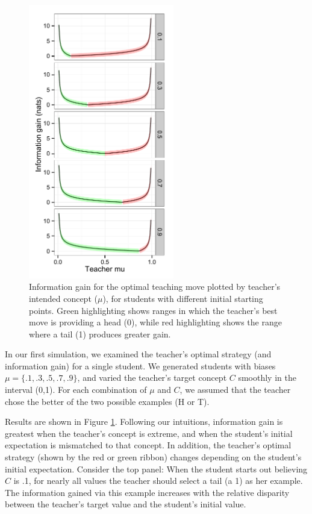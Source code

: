 \documentclass[10pt,letterpaper]{article}
\begin{document}
\begin{figure}[t]
\begin{center}
\includegraphics[width=2.5in]{figures/single_student_gain.pdf}
\end{center}
\caption{\label{fig:student} Information gain for the optimal teaching move plotted by teacher's intended concept ($\mu$), for students with different initial starting points. Green highlighting shows ranges in which the teacher's best move is providing a head (0), while red highlighting shows the range where a tail (1) produces greater gain.}
\end{figure}

In our first simulation, we examined the teacher's optimal strategy (and information gain) for a single student. We generated students with biases $\mu= \{.1, .3, .5, .7, .9\}$, and varied the teacher's target concept $C$ smoothly in the interval (0,1). For each combination of $\mu$ and $C$, we assumed that the teacher chose the better of the two possible examples (H or T). 

Results are shown in Figure \ref{fig:student}. Following our intuitions, information gain is greatest when the teacher's concept is extreme, and when the student's initial expectation is mismatched to that concept. In addition, the teacher's optimal strategy (shown by the red or green ribbon) changes depending on the student's initial expectation. Consider the top panel: When the student starts out believing $C$ is .1, for nearly all values the teacher should select a tail (a 1) as her example. The information gained via this example increases with the relative disparity between the teacher's target value and the student's initial value.
\end{document}
